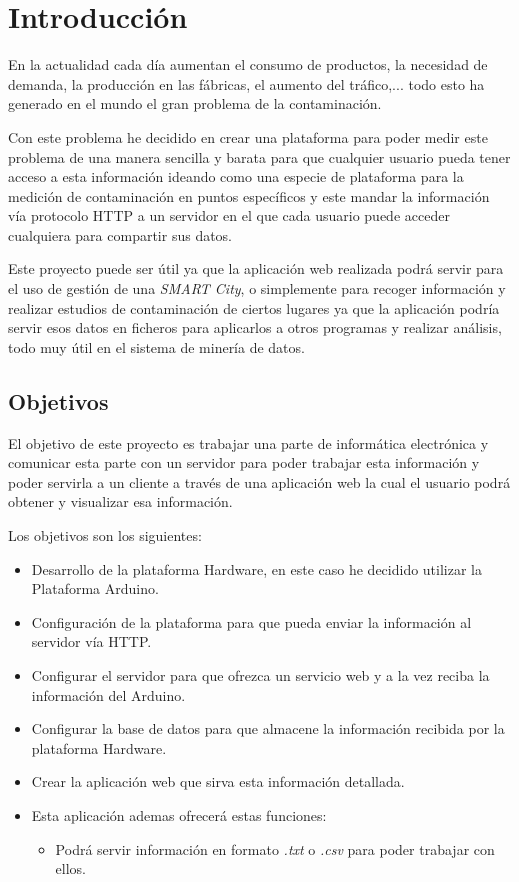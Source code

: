 
\chapter{Introducción}

	En la actualidad cada día aumentan el consumo de productos, la necesidad de demanda, la producción en las fábricas, el aumento del tráfico,... todo esto ha generado en el mundo el gran problema de la contaminación.
	
	\setlength{\parindent}{0ex}Con este problema he decidido en crear una plataforma para poder medir este problema de una manera sencilla y barata para que cualquier usuario pueda tener acceso a esta información ideando como una especie de plataforma para la medición de contaminación en puntos específicos y este mandar la información vía protocolo HTTP a un servidor en el que cada usuario puede acceder cualquiera para compartir sus datos.
	
	Este proyecto puede ser útil ya que la aplicación web realizada podrá servir para el uso de gestión de una \textit{SMART City}, o simplemente para recoger información y realizar estudios de contaminación de ciertos lugares ya que la aplicación podría servir esos datos en ficheros para aplicarlos a otros programas y realizar análisis, todo muy útil en el sistema de minería de datos.

\section{Objetivos}

\setlength{\parindent}{5ex}El objetivo de este proyecto es trabajar una parte de informática electrónica y comunicar esta parte con un servidor para poder trabajar esta información y poder servirla a un cliente a través de una aplicación web la cual el usuario podrá obtener y visualizar esa información.

\setlength{\parindent}{0ex}Los objetivos son los siguientes:

\begin{itemize}
\item Desarrollo de la plataforma Hardware, en este caso he decidido utilizar la Plataforma Arduino.
\item Configuración de la plataforma para que pueda enviar la información al servidor vía HTTP.
\item Configurar el servidor para que ofrezca un servicio web y a la vez reciba la información del Arduino.
\item Configurar la base de datos para que almacene la información recibida por la plataforma Hardware.
\item Crear la aplicación web que sirva esta información detallada.
\item Esta aplicación ademas ofrecerá estas funciones:
	\begin{itemize}
	\item Podrá servir información en formato \textit{.txt} o \textit{.csv} para poder trabajar con ellos.
	
	\end{itemize}
\end{itemize}


